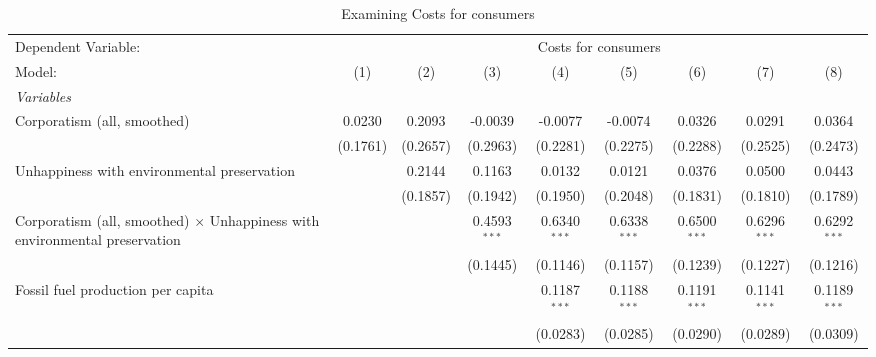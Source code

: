 
\begin{table}[htbp]
   \caption{Examining Costs for consumers}
   \centering
   \begin{tabular}{lcccccccc}
      \tabularnewline \midrule \midrule
      Dependent Variable: & \multicolumn{8}{c}{Costs for consumers}\\
      Model:                                                                            & (1)      & (2)      & (3)            & (4)            & (5)            & (6)            & (7)            & (8)\\  
      \midrule
      \emph{Variables}\\
      Corporatism (all, smoothed)                                                       & 0.0230   & 0.2093   & -0.0039        & -0.0077        & -0.0074        & 0.0326         & 0.0291         & 0.0364\\   
                                                                                        & (0.1761) & (0.2657) & (0.2963)       & (0.2281)       & (0.2275)       & (0.2288)       & (0.2525)       & (0.2473)\\   
      Unhappiness with environmental preservation                                       &          & 0.2144   & 0.1163         & 0.0132         & 0.0121         & 0.0376         & 0.0500         & 0.0443\\   
                                                                                        &          & (0.1857) & (0.1942)       & (0.1950)       & (0.2048)       & (0.1831)       & (0.1810)       & (0.1789)\\   
      Corporatism (all, smoothed) $\times$ Unhappiness with environmental preservation  &          &          & 0.4593$^{***}$ & 0.6340$^{***}$ & 0.6338$^{***}$ & 0.6500$^{***}$ & 0.6296$^{***}$ & 0.6292$^{***}$\\   
                                                                                        &          &          & (0.1445)       & (0.1146)       & (0.1157)       & (0.1239)       & (0.1227)       & (0.1216)\\   
      Fossil fuel production per capita                                                 &          &          &                & 0.1187$^{***}$ & 0.1188$^{***}$ & 0.1191$^{***}$ & 0.1141$^{***}$ & 0.1189$^{***}$\\   
                                                                                        &          &          &                & (0.0283)       & (0.0285)       & (0.0290)       & (0.0289)       & (0.0309)\\   

\end{tabular}
\end{table}
